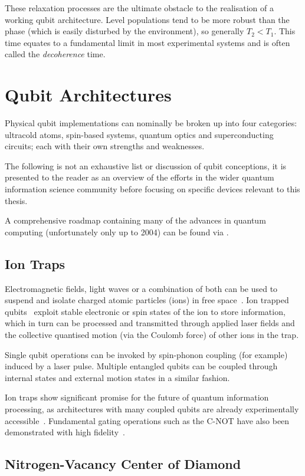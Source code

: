 These relaxation processes are the ultimate obstacle to the realisation of a working qubit architecture.
Level populations tend to be more robust than the phase (which is easily disturbed by the environment), so generally $T_2 < T_1$.
This time equates to a fundamental limit in most experimental systems and is often called the \textit{decoherence} time.

\section{Qubit Architectures}
Physical qubit implementations can nominally be broken up into four categories: ultracold atoms, spin-based systems, quantum optics and superconducting circuits; each with their own strengths and weaknesses.

The following is not an exhaustive list or discussion of qubit conceptions, it is presented to the reader as an overview of the efforts in the wider quantum information science community before focusing on specific devices relevant to this thesis.

A comprehensive roadmap containing many of the advances in quantum computing (unfortunately only up to 2004) can be found via .

\subsection{Ion Traps}
Electromagnetic fields, light waves or a combination of both can be used to suspend and isolate charged atomic particles (ions) in free space~\cite{Paul1990}.
Ion trapped qubits~\cite{Cirac1995} exploit stable electronic or spin states of the ion to store information, which in turn can be processed and transmitted through applied laser fields and the collective quantised motion (via the Coulomb force) of other ions in the trap.

Single qubit operations can be invoked by spin-phonon coupling (for example) induced by a laser pulse.
Multiple entangled qubits can be coupled through internal states and external motion states in a similar fashion.

Ion traps show significant promise for the future of quantum information processing, as architectures with many coupled qubits are already experimentally accessible~\cite{Nigg2014}.
Fundamental gating operations such as the C-NOT have also been demonstrated with high fidelity~\cite{Schmidt-Kaler2003}.

\subsection{Nitrogen-Vacancy Center of Diamond}

